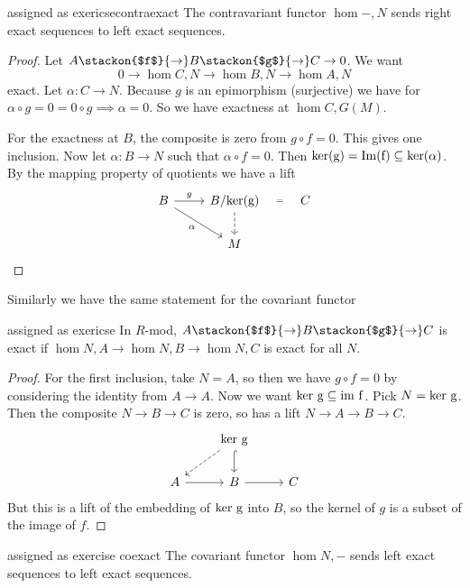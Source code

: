 \begin{aproposition}{assigned as exericse}{contraexact}
    The contravariant functor $\hom{-,N}$ sends right exact sequences to left exact sequences.
\end{aproposition}
\begin{proof}
     Let $A\stackon{$f$}{\to} B \stackon{$g$}{\to} C \to 0$. We want \[
     0\to \hom{C,N} \to \hom{B,N}\to \hom{A,N}
     \]
     exact.
    Let $\alpha:C\to N$. Because $g$ is an epimorphism (surjective) we have for $\alpha\circ g=0=0\circ g \implies \alpha=0$. So we have exactness at $\hom{C,G(M)}$.

    For the exactness at $B$, the composite is zero from $g\circ f=0$. This gives one inclusion. Now let $\alpha:B\to N$ such that $\alpha\circ f=0$. Then $\rm{ker}(g)=\rm{Im}(f)\subseteq \rm{ker}(\alpha)$. By the mapping property of quotients we have a lift
\[\begin{tikzcd}
	B & {B/\rm{ker}(g)} & C \\
	& M
	\arrow["g", from=1-1, to=1-2]
	\arrow["\alpha"', from=1-1, to=2-2]
	\arrow["{=}"{description}, draw=none, from=1-2, to=1-3]
	\arrow[dashed,from=1-2, to=2-2]
\end{tikzcd}\]

\end{proof}
Similarly we have the same statement for the covariant functor
\begin{aproposition}{assigned as exericse}{}
      In $R$-mod, $A\stackon{$f$}{\to} B \stackon{$g$}{\to} C$ is exact if $\hom{N,A}\to \hom{N,B} \to \hom{N,C}$ is exact for all $N$.


\end{aproposition}
\begin{proof}
    For the first inclusion, take $N=A$, so then we have $g\circ f =0$ by considering the identity from $A\to A$. Now we want $\rm{ker} \ g \subseteq \rm{im} \ f$. Pick $N=\rm{ker} \ g$. Then the composite $N\to B \to C$ is zero, so has a lift $N\to A\to B \to C$.
    \[\begin{tikzcd}
	& {\rm{ker} \ g} \\
	A & B & C
	\arrow[dashed, from=1-2, to=2-1]
	\arrow[hook, from=1-2, to=2-2]
	\arrow[from=2-1, to=2-2]
	\arrow[from=2-2, to=2-3]
\end{tikzcd}\] But this is a lift of the embedding of $\rm{ker } \ g $ into $B$, so the kernel of $g$ is a subset of the image of $f$.
\end{proof}
\begin{aproposition}{assigned as exercise}  {coexact}
    The covariant functor $\hom{N,-} $ sends left exact sequences to left exact sequences. 
\end{aproposition}
